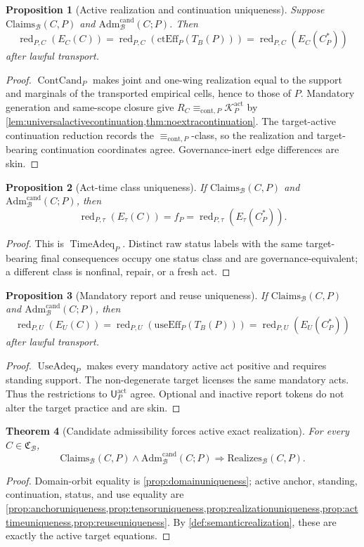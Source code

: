 \documentclass[11pt]{article}
\newtheorem{theorem}{Theorem}[section]
\newtheorem{proposition}[theorem]{Proposition}
\theoremstyle{definition}
\newcommand{\Bell}{\mathcal{B}}
\newcommand{\BellConstr}{\mathfrak{C}_{\Bell}}
\newcommand{\AdmBell}{\mathrm{Adm}^{\mathrm{cand}}_{\Bell}}
\newcommand{\ClaimsBell}{\mathrm{Claims}_{\Bell}}
\newcommand{\RealizesBell}{\mathrm{Realizes}_{\Bell}}
\newcommand{\CanonC}{C^{*}_{P}}
\newcommand{\ContEff}{\mathrm{ctEff}_{P}}
\newcommand{\ReuseEff}{\mathrm{useEff}_{P}}
\newcommand{\Active}{\mathrm{act}}
\newcommand{\ContEq}{\equiv_{\mathrm{cont},P}}
\begin{document}
\begin{proposition}[Active realization and continuation uniqueness]\label{prop:realizationuniqueness}
Suppose $\ClaimsBell(C,P)$ and $\AdmBell(C;P)$. Then
\[
\operatorname{red}_{P,C}(E_C(C))
=\operatorname{red}_{P,C}(\ContEff(T_B(P)))
=\operatorname{red}_{P,C}(E_C(\CanonC))
\]
after lawful transport.
\end{proposition}
\begin{proof}
$\operatorname{ContCand}_P$ makes joint and one-wing realization equal to the support and marginals of the transported empirical cells, hence to those of $P$. Mandatory generation and same-scope closure give $R_C\ContEq\mathcal K_P^{\Active}$ by \cref{lem:universalactivecontinuation,thm:noextracontinuation}. The target-active continuation reduction records the $\ContEq$-class, so the realization and target-bearing continuation coordinates agree. Governance-inert edge differences are skin.
\end{proof}

\begin{proposition}[Act-time class uniqueness]\label{prop:acttimeuniqueness}
If $\ClaimsBell(C,P)$ and $\AdmBell(C;P)$, then
\[
\operatorname{red}_{P,\tau}(E_{\tau}(C))
=f_P
=\operatorname{red}_{P,\tau}(E_{\tau}(\CanonC)).
\]
\end{proposition}
\begin{proof}
This is $\operatorname{TimeAdeq}_P$. Distinct raw status labels with the same target-bearing final consequences occupy one status class and are governance-equivalent; a different class is nonfinal, repair, or a fresh act.
\end{proof}

\begin{proposition}[Mandatory report and reuse uniqueness]\label{prop:reuseuniqueness}
If $\ClaimsBell(C,P)$ and $\AdmBell(C;P)$, then
\[
\operatorname{red}_{P,U}(E_U(C))
=\operatorname{red}_{P,U}(\ReuseEff(T_B(P)))
=\operatorname{red}_{P,U}(E_U(\CanonC))
\]
after lawful transport.
\end{proposition}
\begin{proof}
$\operatorname{UseAdeq}_P$ makes every mandatory active act positive and requires standing support. The non-degenerate target licenses the same mandatory acts. Thus the restrictions to $\mathsf U_P^{\Active}$ agree. Optional and inactive report tokens do not alter the target practice and are skin.
\end{proof}

\begin{theorem}[Candidate admissibility forces active exact realization]\label{thm:candidateforcesrealization}
For every $C\in\BellConstr$,
\[
\ClaimsBell(C,P)\wedge\AdmBell(C;P)
\Longrightarrow
\RealizesBell(C,P).
\]
\end{theorem}
\begin{proof}
Domain-orbit equality is \cref{prop:domainuniqueness}; active anchor, standing, continuation, status, and use equality are \cref{prop:anchoruniqueness,prop:tensoruniqueness,prop:realizationuniqueness,prop:acttimeuniqueness,prop:reuseuniqueness}. By \cref{def:semanticrealization}, these are exactly the active target equations.
\end{proof}
\end{document}
